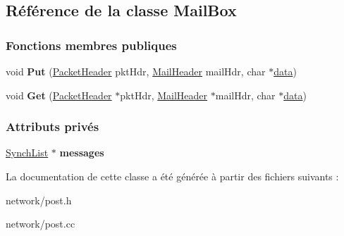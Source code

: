 \hypertarget{class_mail_box}{}\subsection{Référence de la classe Mail\+Box}
\label{class_mail_box}
\subsubsection*{Fonctions membres publiques}
\begin{DoxyCompactItemize}
\item 
\hypertarget{class_mail_box_ad3c3f85a2bc7e49081e7d8b793b1ef6f}{}\label{class_mail_box_ad3c3f85a2bc7e49081e7d8b793b1ef6f} 
void {\bfseries Put} (\hyperlink{class_packet_header}{Packet\+Header} pkt\+Hdr, \hyperlink{class_mail_header}{Mail\+Header} mail\+Hdr, char $\ast$\hyperlink{structdata}{data})
\item 
\hypertarget{class_mail_box_a4eda4fa3299b15d8c0cf23d620676524}{}\label{class_mail_box_a4eda4fa3299b15d8c0cf23d620676524} 
void {\bfseries Get} (\hyperlink{class_packet_header}{Packet\+Header} $\ast$pkt\+Hdr, \hyperlink{class_mail_header}{Mail\+Header} $\ast$mail\+Hdr, char $\ast$\hyperlink{structdata}{data})
\end{DoxyCompactItemize}
\subsubsection*{Attributs privés}
\begin{DoxyCompactItemize}
\item 
\hypertarget{class_mail_box_a78060b8e29deb523d3ced2f996382e1d}{}\label{class_mail_box_a78060b8e29deb523d3ced2f996382e1d} 
\hyperlink{class_synch_list}{Synch\+List} $\ast$ {\bfseries messages}
\end{DoxyCompactItemize}


La documentation de cette classe a été générée à partir des fichiers suivants \+:\begin{DoxyCompactItemize}
\item 
network/post.\+h\item 
network/post.\+cc\end{DoxyCompactItemize}
